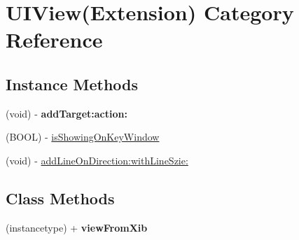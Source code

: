 \hypertarget{category_u_i_view_07_extension_08}{}\section{U\+I\+View(Extension) Category Reference}
\label{category_u_i_view_07_extension_08}
\subsection*{Instance Methods}
\begin{DoxyCompactItemize}
\item 
\mbox{\label{category_u_i_view_07_extension_08_a9aa581e4314f4446b73edf896939d526}} 
(void) -\/ {\bfseries add\+Target\+:action\+:}
\item 
(B\+O\+OL) -\/ \mbox{\hyperlink{category_u_i_view_07_extension_08_ab3356b5aa1eaa99b6218a1175a5eddaf}{is\+Showing\+On\+Key\+Window}}
\item 
(void) -\/ \mbox{\hyperlink{category_u_i_view_07_extension_08_afbbedfbe2a9ade8c32c1785948c76575}{add\+Line\+On\+Direction\+:with\+Line\+Szie\+:}}
\end{DoxyCompactItemize}
\subsection*{Class Methods}
\begin{DoxyCompactItemize}
\item 
\mbox{\label{category_u_i_view_07_extension_08_ad681222aa1a13199d28521770cd1bb49}} 
(instancetype) + {\bfseries view\+From\+Xib}
\end{DoxyCompactItemize}
